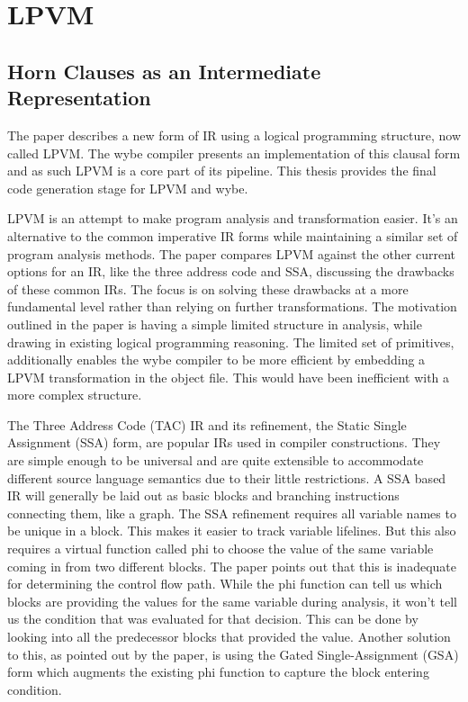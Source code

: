 \chapter{LPVM}

\section{Horn Clauses as an Intermediate Representation}

The paper describes a new form of IR using a logical programming structure, now
called LPVM. The wybe compiler presents an implementation of this clausal form
and as such LPVM is a core part of its pipeline. This thesis provides the final
code generation stage for LPVM and wybe.

LPVM is an attempt to make program analysis and transformation easier. It's an
alternative to the common imperative IR forms while maintaining a similar set
of program analysis methods. The paper compares LPVM against the other current
options for an IR, like the three address code and SSA, discussing the
drawbacks of these common IRs. The focus is on solving these drawbacks at a
more fundamental level rather than relying on further transformations. The
motivation outlined in the paper is having a simple limited structure in
analysis, while drawing in existing logical programming reasoning. The limited
set of primitives, additionally enables the wybe compiler to be more efficient
by embedding a LPVM transformation in the object file. This would have been
inefficient with a more complex structure.

The Three Address Code (TAC) IR and its refinement, the Static Single
Assignment (SSA) form, are popular IRs used in compiler constructions. They are
simple enough to be universal and are quite extensible to accommodate different
source language semantics due to their little restrictions. A SSA based IR will
generally be laid out as basic blocks and branching instructions connecting
them, like a graph. The SSA refinement requires all variable names to be unique
in a block. This makes it easier to track variable lifelines. But
this also requires a virtual function called phi to choose the value of the
same variable coming in from two different blocks. The paper points out that
this is inadequate for determining the control flow path. While the phi
function can tell us which blocks are providing the values for the same
variable during analysis, it won't tell us the condition that was evaluated for
that decision. This can be done by looking into all the predecessor blocks that
provided the value. Another solution to this, as pointed out by the paper, is
using the Gated Single-Assignment (GSA) form which augments the existing phi
function to capture the block entering condition.

